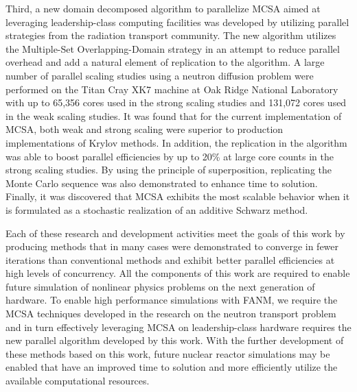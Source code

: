 Third, a new domain decomposed algorithm to parallelize MCSA aimed at
leveraging leadership-class computing facilities was developed by
utilizing parallel strategies from the radiation transport
community. The new algorithm utilizes the Multiple-Set
Overlapping-Domain strategy in an attempt to reduce parallel overhead
and add a natural element of replication to the algorithm. A large
number of parallel scaling studies using a neutron diffusion problem
were performed on the Titan Cray XK7 machine at Oak Ridge National
Laboratory with up to 65,356 cores used in the strong scaling studies
and 131,072 cores used in the weak scaling studies. It was found that
for the current implementation of MCSA, both weak and strong scaling
were superior to production implementations of Krylov methods. In
addition, the replication in the algorithm was able to boost parallel
efficiencies by up to 20\% at large core counts in the strong scaling
studies. By using the principle of superposition, replicating the
Monte Carlo sequence was also demonstrated to enhance time to
solution. Finally, it was discovered that MCSA exhibits the most
scalable behavior when it is formulated as a stochastic realization of
an additive Schwarz method.

Each of these research and development activities meet the goals of
this work by producing methods that in many cases were demonstrated to
converge in fewer iterations than conventional methods and exhibit
better parallel efficiencies at high levels of concurrency. All the
components of this work are required to enable future simulation of
nonlinear physics problems on the next generation of hardware. To
enable high performance simulations with FANM, we require the MCSA
techniques developed in the research on the neutron transport problem
and in turn effectively leveraging MCSA on leadership-class hardware
requires the new parallel algorithm developed by this work. With the
further development of these methods based on this work, future
nuclear reactor simulations may be enabled that have an improved time
to solution and more efficiently utilize the available computational
resources.

